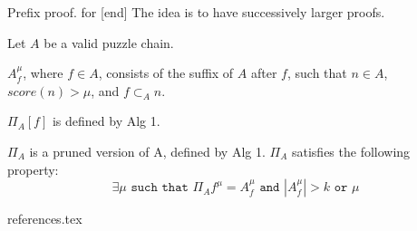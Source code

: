\documentclass[11pt]{llncs}
\begin{document}
	Prefix proof.  for [end]
		The idea is to have successively larger proofs.








	Let $A$ be a valid puzzle chain.
	
    $A_{f}^{\mu}$, where $f \in A$, consists of the suffix of $A$ after
    $f$, such that $n \in A$, $score(n) > \mu$, and $f \subset_A n$.


	$\Pi_A[f]$  is defined by Alg 1.


$\Pi_{A}$ is a pruned version of A, defined by Alg 1.
$\Pi_{A}$ satisfies the following property:
     \begin{equation*}
         \exists \mu \texttt{ such that } \Pi_{A}{f}^{\mu} = A_f^{\mu}
         \texttt{ and }
         |A_f^{\mu}| > k
         \texttt{ or } \mu 
     \end{equation*}

{references.tex}
\end{document}
